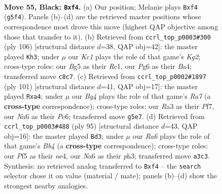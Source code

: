 \documentclass[11pt]{article}
\begin{document}
\clearpage

\begin{figure}[p]\centering
\begin{subfigure}{0.46\textwidth}\centering
\resizebox{\linewidth}{!}{%
\newchessgame
\chessboard[
  setfen={2k5/1p5p/n5pP/p4pb1/5N2/r5P1/3R3K/4R3 b - - 7 55},
  showmover=false,
  pgfstyle=straightmove, color=movearrow, markmove={g5-f4}
]}
\caption{}
\end{subfigure}\hfill
\begin{subfigure}{0.46\textwidth}\centering
\resizebox{\linewidth}{!}{%
\newchessgame
\chessboard[
  setfen={2r5/4P2k/5Pp1/p1n4p/B6P/6P1/4r1K1/2R5 w - - 3 54},
  showmover=false,
  pgfstyle=straightmove, color=movearrow, markmove={g2-h3}
]}
\caption{}
\end{subfigure}
\\[4pt]
\begin{subfigure}{0.46\textwidth}\centering
\resizebox{\linewidth}{!}{%
\newchessgame
\chessboard[
  setfen={8/5pk1/1R2p3/p2pP1p1/P2P4/8/r3NK2/8 b - - 0 51},
  showmover=false,
  pgfstyle=straightmove, color=movearrow, markmove={a2-a4}
]}
\caption{}
\end{subfigure}\hfill
\begin{subfigure}{0.46\textwidth}\centering
\resizebox{\linewidth}{!}{%
\newchessgame
\chessboard[
  setfen={8/7p/5pk1/1b2p3/4N3/B3P2P/1pr2P2/1R2K3 b - - 0 48},
  showmover=false,
  pgfstyle=straightmove, color=movearrow, markmove={b5-d3}
]}
\caption{}
\end{subfigure}
\caption{\textbf{Move 55, Black: \texttt{Bxf4}.} (a) Our position; Melanie plays \texttt{Bxf4} (\texttt{g5f4}). Panels (b)--(d) are the retrieved master positions whose correspondence most drove this move (highest QAP objective among those that transfer to it). (b) Retrieved from \texttt{ccrl\_top\_p0003\#300} (ply 106) [structural distance $d$=38, QAP obj=42]: the master played \texttt{Kh3}; under $\mu$ our \emph{Kc1} plays the role of that game's \emph{Kg2}; cross-type roles: our \emph{B}g5 as their \emph{R}c1, our \emph{P}g6 as their \emph{B}a4; transferred move \texttt{c8c7}. (c) Retrieved from \texttt{ccrl\_top\_p0002\#1897} (ply 101) [structural distance $d$=41, QAP obj=17]: the master played \texttt{Rxa4}; under $\mu$ our \emph{Bg4} plays the role of that game's \emph{Ra7} (a \textbf{cross-type} correspondence); cross-type roles: our \emph{R}a3 as their \emph{P}f7, our \emph{N}a6 as their \emph{P}e6; transferred move \texttt{g5e7}. (d) Retrieved from \texttt{ccrl\_top\_p0003\#488} (ply 95) [structural distance $d$=43, QAP obj=16]: the master played \texttt{Bd3}; under $\mu$ our \emph{Ra6} plays the role of that game's \emph{Bb4} (a \textbf{cross-type} correspondence); cross-type roles: our \emph{P}f5 as their \emph{n}e4, our \emph{N}a6 as their \emph{p}h3; transferred move \texttt{a3c3}. Synthesis: no retrieved analog transferred to \texttt{Bxf4} -- the \texttt{search} selector chose it on value (material / mate); panels (b)--(d) show the strongest nearby analogies.}
\label{fig:thought-m109}
\end{figure}
\end{document}
